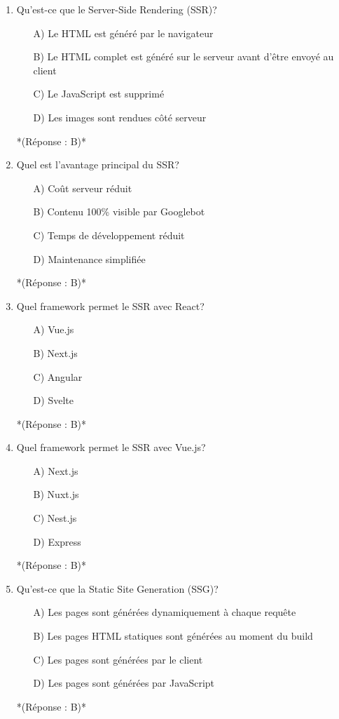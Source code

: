 \documentclass[12pt,a4paper,twoside]{report}
\begin{document}
\begin{enumerate}
\item Qu'est-ce que le Server-Side Rendering (SSR)?
\begin{itemize}
\item[A)] Le HTML est généré par le navigateur
\item[B)] Le HTML complet est généré sur le serveur avant d'être envoyé au client
\item[C)] Le JavaScript est supprimé
\item[D)] Les images sont rendues côté serveur
\end{itemize}
*(Réponse : B)*

\item Quel est l'avantage principal du SSR?
\begin{itemize}
\item[A)] Coût serveur réduit
\item[B)] Contenu 100\% visible par Googlebot
\item[C)] Temps de développement réduit
\item[D)] Maintenance simplifiée
\end{itemize}
*(Réponse : B)*

\item Quel framework permet le SSR avec React?
\begin{itemize}
\item[A)] Vue.js
\item[B)] Next.js
\item[C)] Angular
\item[D)] Svelte
\end{itemize}
*(Réponse : B)*

\item Quel framework permet le SSR avec Vue.js?
\begin{itemize}
\item[A)] Next.js
\item[B)] Nuxt.js
\item[C)] Nest.js
\item[D)] Express
\end{itemize}
*(Réponse : B)*

\item Qu'est-ce que la Static Site Generation (SSG)?
\begin{itemize}
\item[A)] Les pages sont générées dynamiquement à chaque requête
\item[B)] Les pages HTML statiques sont générées au moment du build
\item[C)] Les pages sont générées par le client
\item[D)] Les pages sont générées par JavaScript
\end{itemize}
*(Réponse : B)*


\end{enumerate}
\end{document}
